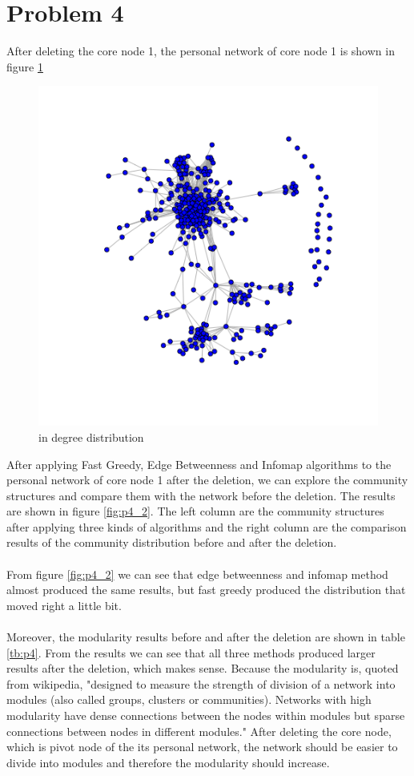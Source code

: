 \documentclass{article}
\begin{document}
\section{Problem 4}
After deleting the core node 1, the personal network of core node 1 is shown in figure \ref{fig:p4_1}
\begin{figure}[htbp]
\centering
\includegraphics[width=.8\textwidth]{p4_1.png}
\caption{in degree distribution}
\label{fig:p4_1}
\end{figure}
After applying Fast Greedy, Edge Betweenness and Infomap algorithms to the personal network of core node 1 after the deletion, we can explore the community structures and compare them with the network before the deletion. The results are shown in figure \ref{fig:p4_2}. The left column are the community structures after applying three kinds of algorithms and the right column are the comparison results of the community distribution before and after the deletion.\\
\\
 From figure \ref{fig:p4_2} we can see that edge betweenness and infomap method almost produced the same results, but fast greedy produced the distribution that moved right a little bit. \\
 \\
 Moreover, the modularity results before and after the deletion are shown in table \ref{tb:p4}. From the results we can see that all three methods produced larger results after the deletion, which makes sense. Because the modularity is, quoted from wikipedia, "designed to measure the strength of division of a network into modules (also called groups, clusters or communities). Networks with high modularity have dense connections between the nodes within modules but sparse connections between nodes in different modules." After deleting the core node, which is pivot node of the its personal network, the network should be easier to divide into modules and therefore the modularity should increase.
\end{document}
